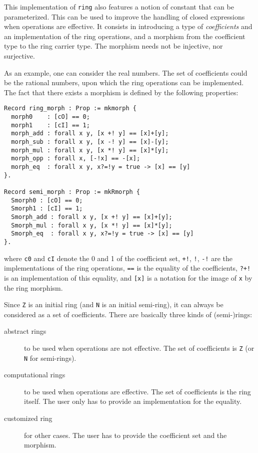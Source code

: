 This implementation of {\tt ring} also features a notion of constant
that can be parameterized. This can be used to improve the handling of
closed expressions when operations are effective. It consists in
introducing a type of \emph{coefficients} and an implementation of the
ring operations, and a morphism from the coefficient type to the ring
carrier type. The morphism needs not be injective, nor surjective.

As
an example, one can consider the real numbers. The set of coefficients
could be the rational numbers, upon which the ring operations can be
implemented. The fact that there exists a morphism is defined by the
following properties:
\begin{verbatim}
Record ring_morph : Prop := mkmorph {
  morph0    : [cO] == 0;
  morph1    : [cI] == 1;
  morph_add : forall x y, [x +! y] == [x]+[y];
  morph_sub : forall x y, [x -! y] == [x]-[y];
  morph_mul : forall x y, [x *! y] == [x]*[y];
  morph_opp : forall x, [-!x] == -[x];
  morph_eq  : forall x y, x?=!y = true -> [x] == [y]
}.

Record semi_morph : Prop := mkRmorph {
  Smorph0 : [cO] == 0;
  Smorph1 : [cI] == 1;
  Smorph_add : forall x y, [x +! y] == [x]+[y];
  Smorph_mul : forall x y, [x *! y] == [x]*[y];
  Smorph_eq  : forall x y, x?=!y = true -> [x] == [y]
}.
\end{verbatim}
where {\tt c0} and {\tt cI} denote the 0 and 1 of the coefficient set,
{\tt +!}, {\tt *!}, {\tt -!} are the implementations of the ring
operations, {\tt ==} is the equality of the coefficients, {\tt ?+!} is
an implementation of this equality, and {\tt [x]} is a notation for
the image of {\tt x} by the ring morphism.



Since {\tt Z} is an initial ring (and {\tt N} is an initial
semi-ring), it can always be considered as a set of
coefficients. There are basically three kinds of (semi-)rings:
\begin{description}
\item[abstract rings] to be used when operations are not
  effective. The set of coefficients is {\tt Z} (or {\tt N} for
  semi-rings).
\item[computational rings] to be used when operations are
  effective. The set of coefficients is the ring itself. The user only
  has to provide an implementation for the equality.
\item[customized ring] for other cases. The user has to provide the
  coefficient set and the morphism.
\end{description}

